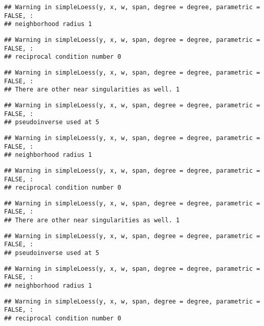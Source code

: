 \documentclass[
]{article}
\begin{document}
\begin{verbatim}
## Warning in simpleLoess(y, x, w, span, degree = degree, parametric = FALSE, :
## neighborhood radius 1
\end{verbatim}

\begin{verbatim}
## Warning in simpleLoess(y, x, w, span, degree = degree, parametric = FALSE, :
## reciprocal condition number 0
\end{verbatim}

\begin{verbatim}
## Warning in simpleLoess(y, x, w, span, degree = degree, parametric = FALSE, :
## There are other near singularities as well. 1
\end{verbatim}

\begin{verbatim}
## Warning in simpleLoess(y, x, w, span, degree = degree, parametric = FALSE, :
## pseudoinverse used at 5
\end{verbatim}

\begin{verbatim}
## Warning in simpleLoess(y, x, w, span, degree = degree, parametric = FALSE, :
## neighborhood radius 1
\end{verbatim}

\begin{verbatim}
## Warning in simpleLoess(y, x, w, span, degree = degree, parametric = FALSE, :
## reciprocal condition number 0
\end{verbatim}

\begin{verbatim}
## Warning in simpleLoess(y, x, w, span, degree = degree, parametric = FALSE, :
## There are other near singularities as well. 1
\end{verbatim}

\begin{verbatim}
## Warning in simpleLoess(y, x, w, span, degree = degree, parametric = FALSE, :
## pseudoinverse used at 5
\end{verbatim}

\begin{verbatim}
## Warning in simpleLoess(y, x, w, span, degree = degree, parametric = FALSE, :
## neighborhood radius 1
\end{verbatim}

\begin{verbatim}
## Warning in simpleLoess(y, x, w, span, degree = degree, parametric = FALSE, :
## reciprocal condition number 0
\end{verbatim}
\end{document}
